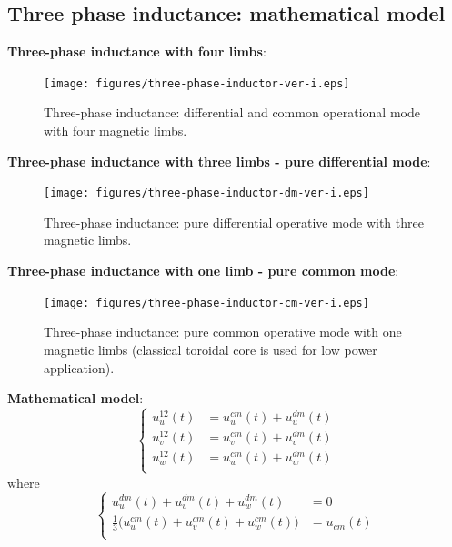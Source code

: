 \documentclass[11pt,a4paper]{scrartcl}
\title{\textbf{ 
	\begin{LARGE}
		Three Phase Inductors
	\end{LARGE} \\[24pt]
	\begin{Large}
		Mathematical Model and Construction
	\end{Large}}
}
\author{\textbf{Davide Bagnara}}
\numberwithin{equation}{section}
\theoremstyle{it}
\theoremstyle{definition}
\begin{document}
	\thispagestyle{empty}
	\begin{mybox}
		\maketitle
		\vspace{150mm}
	\end{mybox}
	\newpage
	\tableofcontents%
	\listoffigures%
	\listoftables
	\newpage
	
\begin{onehalfspace}
	
	\pagebreak
	\section{Three phase inductance: mathematical model}
	\noindent\textbf{Three-phase inductance with four limbs}:
	\begin{figure}[H]
		\centering
		\texttt{[image: figures/three-phase-inductor-ver-i.eps]}
		\captionsetup{width=0.75\textwidth, font=small}	
		\caption{Three-phase inductance: differential and common operational mode with four magnetic limbs.}
		\label{fig1}
	\end{figure}
	\noindent\textbf{Three-phase inductance with three limbs - pure differential mode}:
	\begin{figure}[H]
		\centering
		\texttt{[image: figures/three-phase-inductor-dm-ver-i.eps]}
		\captionsetup{width=0.75\textwidth, font=small}	
		\caption{Three-phase inductance: pure differential operative mode with three magnetic limbs.}
		\label{fig2}
	\end{figure}
	
	\noindent\textbf{Three-phase inductance with one limb - pure common mode}:
	\begin{figure}[H]
		\centering
		\texttt{[image: figures/three-phase-inductor-cm-ver-i.eps]}
		\captionsetup{width=0.75\textwidth, font=small}	
		\caption{Three-phase inductance: pure common operative mode with one magnetic limbs (classical toroidal core is used for low power application).}
		\label{fig3}
	\end{figure}
	\noindent\textbf{Mathematical model}:
	\begin{equation}\left\lbrace 
		\begin{aligned}
			u_u^{12}(t) &= u_u^{cm}(t)+u_u^{dm}(t) \\[6pt]
			u_v^{12}(t) &= u_v^{cm}(t)+u_v^{dm}(t) \\[6pt]
			u_w^{12}(t) &= u_w^{cm}(t)+u_w^{dm}(t) \\[6pt]
		\end{aligned}\right. 
	\end{equation}
	where
	\begin{equation}\left\lbrace 
		\begin{aligned}
			u_u^{dm}(t) + u_v^{dm}(t) + u_w^{dm}(t) &= 0 \\[6pt]
			\frac{1}{3}\Big(u_u^{cm}(t) + u_v^{cm}(t) + u_w^{cm}(t)\Big) &= u_{cm}(t) \\[6pt]
		\end{aligned}\right. 
	\end{equation}
	

\end{onehalfspace}
\end{document}
